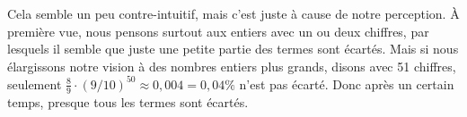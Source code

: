 Cela semble un peu contre-intuitif, mais c'est juste \`a cause de notre perception.
\`A premi\`ere vue, nous pensons surtout aux entiers avec un ou deux chiffres,
par lesquels il semble que juste une petite partie des termes sont \'ecart\'es.
Mais si nous \'elargissons notre vision \`a des nombres entiers plus grands,
disons avec 51 chiffres, seulement $\frac{8}{9} \cdot \left(9/10\right)^{50}
\approx 0,004 = 0,04\%$ n'est pas \'ecart\'e. Donc apr\`es un certain
temps, presque tous les termes sont \'ecart\'es.
